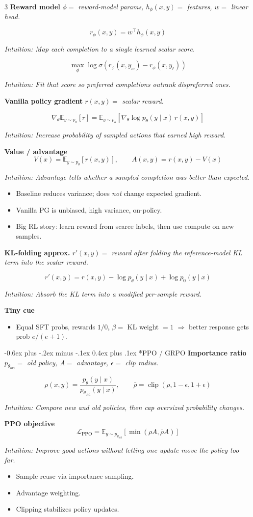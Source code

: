 \documentclass[10pt,landscape]{article}
\makeatletter
\renewcommand{\section}{\@startsection{section}{1}{0mm}%
  {-0.6ex plus -.2ex minus -.1ex}%
  {0.4ex plus .1ex}%
  {\normalfont\normalsize\bfseries}}
\newcommand{\E}{\mathbb{E}}
\newcommand{\clip}{\operatorname{clip}}
\newcommand{\head}[1]{\section*{#1}}
\newcommand{\mini}[1]{\textbf{#1}}
\newcommand{\defs}[1]{{\emph{#1}}\par}
\newcommand{\intuition}[1]{{\scriptsize\emph{Intuition: #1}\par}}
\makeatother
\begin{document}
\begin{multicols}{3}
\mini{Reward model}
\defs{\(\phi=\) reward-model params,\; \(h_\phi(x,y)=\) features,\; \(w=\) linear head.}
\[
r_\phi(x,y)=w^\top h_\phi(x,y)
\]
\intuition{Map each completion to a single learned scalar score.}
\[
\max_\phi \log \sigma(r_\phi(x,y_w)-r_\phi(x,y_\ell))
\]
\intuition{Fit that score so preferred completions outrank dispreferred ones.}

\mini{Vanilla policy gradient}
\defs{\(r(x,y)=\) scalar reward.}
\[
\nabla_\theta \E_{y\sim p_\theta}[r]
=
\E_{y\sim p_\theta}
\left[\nabla_\theta\log p_\theta(y\mid x)\, r(x,y)\right]
\]
\intuition{Increase probability of sampled actions that earned high reward.}

\mini{Value / advantage}
\[
V(x)=\E_{y\sim p_\theta}[r(x,y)],
\qquad
A(x,y)=r(x,y)-V(x)
\]
\intuition{Advantage tells whether a sampled completion was better than expected.}
\begin{itemize}
\item Baseline reduces variance; does \emph{not} change expected gradient.
\item Vanilla PG is unbiased, high variance, on-policy.
\item Big RL story: learn reward from scarce labels, then use compute on new samples.
\end{itemize}

\mini{KL-folding approx.}
\defs{\(r'(x,y)=\) reward after folding the reference-model KL term into the scalar reward.}
\[
r'(x,y)=r(x,y)-\log p_\theta(y\mid x)+\log p_0(y\mid x)
\]
\intuition{Absorb the KL term into a modified per-sample reward.}

\mini{Tiny cue}
\begin{itemize}
\item Equal SFT probs, rewards \(1/0\), \(\beta=\) KL weight \(=1\) \(\Rightarrow\) better response gets prob \(e/(e+1)\).
\end{itemize}

\head{PPO / GRPO}
\mini{Importance ratio}
\defs{\(p_{\theta_{\mathrm{old}}}=\) old policy,\; \(A=\) advantage,\; \(\epsilon=\) clip radius.}
\[
\rho(x,y)=\frac{p_\theta(y\mid x)}{p_{\theta_{\mathrm{old}}}(y\mid x)},
\qquad
\bar\rho=\clip(\rho,1-\epsilon,1+\epsilon)
\]
\intuition{Compare new and old policies, then cap oversized probability changes.}

\mini{PPO objective}
\[
\mathcal L_{\mathrm{PPO}}
=
\E_{y\sim p_{\theta_{\mathrm{old}}}}
\left[
\min\left(\rho A,\bar\rho A\right)
\right]
\]
\intuition{Improve good actions without letting one update move the policy too far.}
\begin{itemize}
\item Sample reuse via importance sampling.
\item Advantage weighting.
\item Clipping stabilizes policy updates.
\end{itemize}


\end{multicols}
\end{document}
